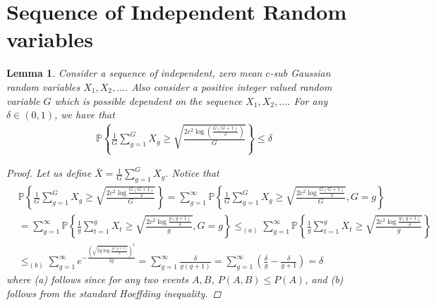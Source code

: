 \documentclass[12pt,draftcls, onecolumn]{IEEEtran}
\newtheorem{lemma}{Lemma}
\begin{document}
\section{Sequence of Independent Random variables}
\begin{lemma}\label{lemma:hoeff_with_dep}
    Consider a sequence of independent, zero mean $c$-sub Gaussian random variables $X_1,X_2,\dots$. Also consider a positive integer valued random variable $G$ which is possible dependent on the sequence $X_1,X_2,\dots$. For any $\delta \in (0,1)$, we have that
    \begin{align}
        \mathbb{P}\left\{\frac{1}{G}\sum_{g=1}^G X_g \geq \sqrt{\frac{2c^2\log\left( \frac{G(G+1)}{\delta}\right)}{G}}\right\} \leq \delta \nonumber
    \end{align}
    \begin{proof}
    Let us define $\bar{X} = \frac{1}{G}\sum_{g=1}^G X_g$. Notice that
        \begin{align}
            &\mathbb{P}\left\{\frac{1}{G}\sum_{g=1}^G X_g\geq \sqrt{\frac{2c^2\log{\frac{G(G+1)}{\delta}}}{G}}\right\} = \sum_{g=1}^{\infty}\mathbb{P}\left\{\frac{1}{G}\sum_{g=1}^G X_g \geq \sqrt{\frac{2c^2\log{\frac{G(G+1)}{\delta}}}{G}},G= g\right\}  \nonumber\\& =  \sum_{g=1}^{\infty}\mathbb{P}\left\{\frac{1}{g}\sum_{t=1}^g X_t \geq \sqrt{\frac{2c^2\log{\frac{g(g+1)}{\delta}}}{g}},G= g\right\} \leq_{(a)}   \sum_{g=1}^{\infty}\mathbb{P}\left\{\frac{1}{g}\sum_{t=1}^g X_t \geq \sqrt{\frac{2c^2\log{\frac{g(g+1)}{\delta}}}{g}}\right\} \nonumber\\& \leq_{(b)} \sum_{g=1}^{\infty}e^{-\frac{\left(\sqrt{2g\log{\frac{g(g+1)}{\delta}}}\right)^2}{2g}}= \sum_{g=1}^{\infty}\frac{\delta}{g(g+1)} = \sum_{g=1}^{\infty}\left(\frac{\delta}{g} - \frac{\delta}{g+1}\right) = \delta \nonumber
        \end{align}
         where (a) follows since for any two events $A,B$, $P(A,B) \leq P(A)$, and (b) follows from the standard Hoeffding inequality.
        \end{proof}
\end{lemma}
\end{document}
